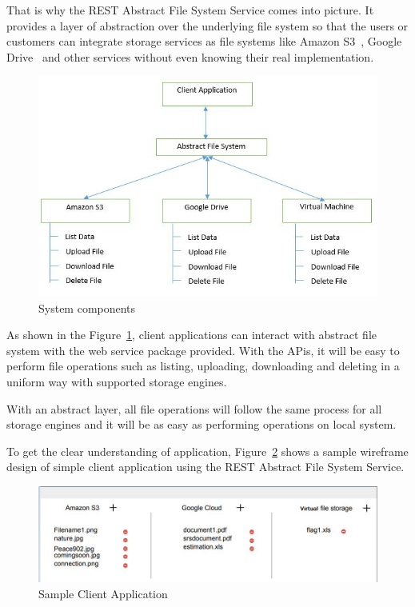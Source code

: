 That is why the REST Abstract File System Service comes into picture. It
provides a layer of abstraction over the underlying file system so
that the users or customers can integrate storage services as file
systems like Amazon S3~\cite{hid-sp18-420-amazon-S3}, Google
Drive~\cite{hid-sp18-420-google-drive} and other services without even
knowing their real implementation.



\begin{figure}[!ht]
        \centering\includegraphics[width=\columnwidth]
        {image/architecture.JPG}
        \caption{System components}\label{fig:architecture}
\end{figure}


As shown in the Figure~\ref{fig:architecture}, client applications can
interact with abstract file system with the web service package
provided. With the APis, it will be easy to perform file operations
such as listing, uploading, downloading and deleting in a uniform way
with supported storage engines.

With an abstract layer, all file operations will follow the same
process for all storage engines and it will be as easy as performing
operations on local system.


To get the clear understanding of application, Figure~\ref{fig:client}
shows a sample wireframe design of simple client application using
the REST Abstract File System Service.


\begin{figure}[!ht]
        \centering\includegraphics[width=\columnwidth]
        {image/client.JPG}
        \caption{Sample Client Application}\label{fig:client}
\end{figure}




